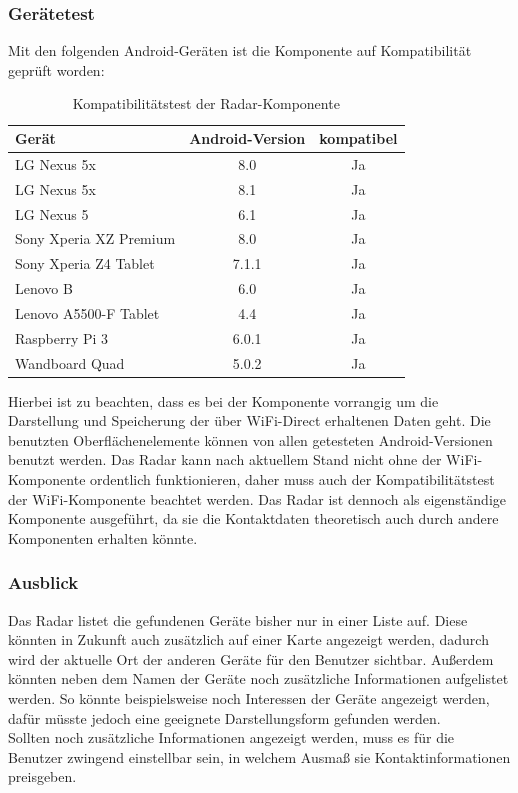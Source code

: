 \subsubsection{Gerätetest}
Mit den folgenden Android-Geräten ist die Komponente auf Kompatibilität geprüft worden:
\begin{table}[H]
	\begin{center}
		\caption{Kompatibilitätstest der Radar-Komponente}
		\label{tab:dimensions}
		\begin{tabular}{l|c|c} 			
			Gerät & Android-Version & kompatibel \\
			\hline
			LG Nexus 5x & 8.0 & Ja\\
			LG Nexus 5x & 8.1 & Ja\\
			LG Nexus 5 & 6.1 & Ja\\
			Sony Xperia XZ Premium & 8.0 & Ja\\
			Sony Xperia Z4 Tablet & 7.1.1 & Ja\\
			Lenovo B & 6.0 & Ja\\
			Lenovo A5500-F Tablet & 4.4 & Ja\\
			Raspberry Pi 3 & 6.0.1 & Ja\\	
			Wandboard Quad & 5.0.2 & Ja\\			
		\end{tabular}
	\end{center}
\end{table}
Hierbei ist zu beachten, dass es bei der Komponente vorrangig um die Darstellung und Speicherung der über WiFi-Direct erhaltenen Daten geht. Die benutzten Oberflächenelemente können von allen getesteten Android-Versionen benutzt werden. Das Radar kann nach aktuellem Stand nicht ohne der WiFi-Komponente ordentlich funktionieren, daher muss auch der Kompatibilitätstest der WiFi-Komponente beachtet werden. Das Radar ist dennoch als eigenständige Komponente ausgeführt, da sie die Kontaktdaten theoretisch auch durch andere Komponenten erhalten könnte.  

\subsubsection{Ausblick}
Das Radar listet die gefundenen Geräte bisher nur in einer Liste auf. Diese könnten in Zukunft auch zusätzlich auf einer Karte angezeigt werden, dadurch wird der aktuelle Ort der anderen Geräte für den Benutzer sichtbar. Außerdem könnten neben dem Namen der Geräte noch zusätzliche Informationen aufgelistet werden. So könnte beispielsweise noch Interessen der Geräte angezeigt werden, dafür müsste jedoch eine geeignete Darstellungsform gefunden werden.
\\Sollten noch zusätzliche Informationen angezeigt werden, muss es für die Benutzer zwingend einstellbar sein, in welchem Ausmaß sie Kontaktinformationen preisgeben.  
\newpage